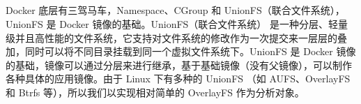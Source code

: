 \documentclass[../../../interview-questions.tex]{subfiles}
\begin{document}
\subsection{\color{red}{容器三把斧之OverlayFS原理与实现}}

Docker 底层有三驾马车，Namespace、CGroup 和 UnionFS（联合文件系统），UnionFS 是 Docker 镜像的基础。UnionFS（联合文件系统） 是一种分层、轻量级并且高性能的文件系统，它支持对文件系统的修改作为一次提交来一层层的叠加，同时可以将不同目录挂载到同一个虚拟文件系统下。UnionFS 是 Docker 镜像的基础，镜像可以通过分层来进行继承，基于基础镜像（没有父镜像），可以制作各种具体的应用镜像。由于 Linux 下有多种的 UnionFS （如 AUFS、OverlayFS 和 Btrfs 等），所以我们以实现相对简单的 OverlayFS 作为分析对象。
\end{document}
